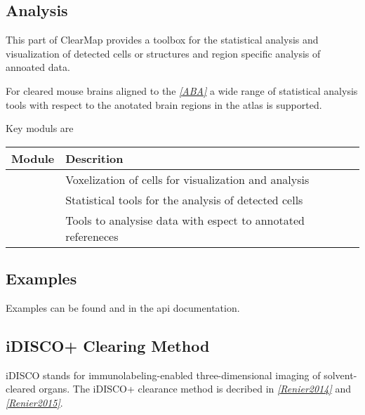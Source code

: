 \documentclass[letterpaper,10pt,english]{sphinxmanual}
\begin{document}
\subsection{Analysis}
\label{introduction:analysis}
This part of ClearMap provides a toolbox for the statistical analysis and
visualization of detected cells or structures and region specific analysis
of annoated data.

For cleared mouse brains aligned to the \label{introduction:id5}{\hyperref[introduction:aba]{\emph{{[}ABA{]}}}} a wide range of statistical
analysis tools with respect to the anotated brain regions in the atlas is
supported.

Key moduls are

\begin{tabulary}{\linewidth}{|L|L|}
\hline
\textsf{\relax 
Module
} & \textsf{\relax 
Descrition
}\\
\hline
{\hyperref[api/ClearMap.Analysis:module-ClearMap.Analysis.Voxelization]{\emph{}}}
 & 
Voxelization of cells for visualization and analysis
\\
\hline
{\hyperref[api/ClearMap.Analysis:module-ClearMap.Analysis.Statistics]{\emph{}}}
 & 
Statistical tools for the analysis of detected cells
\\
\hline
{\hyperref[api/ClearMap.Analysis:module-ClearMap.Analysis.Label]{\emph{}}}
 & 
Tools to analysise data with espect to annotated refereneces
\\
\hline\end{tabulary}



\subsection{Examples}
\label{introduction:examples}
Examples can be found  and in the api documentation.


\subsection{iDISCO+ Clearing Method}
\label{introduction:idisco-clearing-method}
iDISCO stands for immunolabeling-enabled three-dimensional imaging
of solvent-cleared organs. The iDISCO+ clearance method is
decribed in \label{introduction:id6}{\hyperref[introduction:renier2014]{\emph{{[}Renier2014{]}}}} and \label{introduction:id7}{\hyperref[introduction:renier2015]{\emph{{[}Renier2015{]}}}}.
\end{document}

